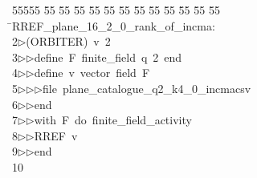 %
%
\begin{tabbing}
55555 \= 55 \= 55 \= 55 \= 55 \= 55 \= 55 \= 55 \= 55 \= 55 \= 55 \= 55 \= 55 \= \>RREF\_plane\_16\_2\_0\_rank\_of\_incma:\\[0pt]
2\>$\triangleright$\>(ORBITER)\ v\ 2\ \\[0pt]
3\>$\triangleright$\>$\triangleright$\>define\ F\ finite\_field\ q\ 2\ end\ \\[0pt]
4\>$\triangleright$\>$\triangleright$\>define\ v\ vector\ field\ F\ \ \\[0pt]
5\>$\triangleright$\>$\triangleright$\>$\triangleright$\>file\ plane\_catalogue\_q2\_k4\_0\_incmacsv\ \\[0pt]
6\>$\triangleright$\>$\triangleright$\>end\ \\[0pt]
7\>$\triangleright$\>$\triangleright$\>with\ F\ do\ finite\_field\_activity\ \\[0pt]
8\>$\triangleright$\>$\triangleright$\>RREF\ v\ \\[0pt]
9\>$\triangleright$\>$\triangleright$\>end\\[0pt]
10\>\end{tabbing}
